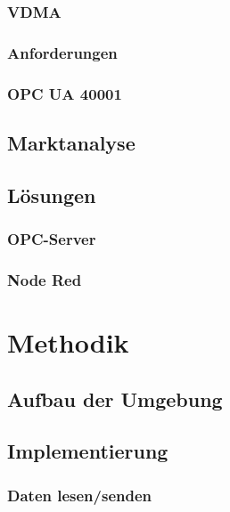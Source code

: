 \documentclass[a4paper, 12pt, oneside]{scrbook}
\begin{document}
	
	\subsection{VDMA}
	\subsection{Anforderungen}
	\subsection{OPC UA 40001}
	
	
	\section{Marktanalyse}
	
	\section{Lösungen}
	\subsection{OPC-Server}
	\subsection{Node Red}
	
	
	
	\chapter{Methodik}
	
	\section{Aufbau der Umgebung}
	
	\section{Implementierung}
		
		\subsection{Daten lesen/senden}
		
\end{document}

